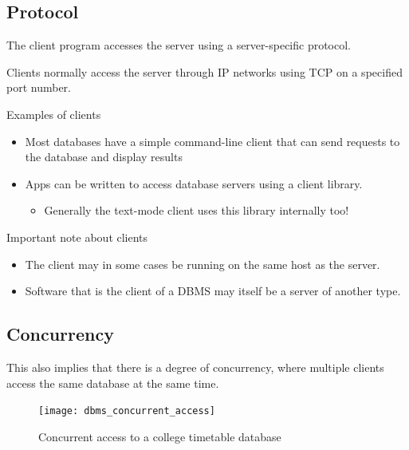 \documentclass[slides]{pgnotes}
\begin{document}
\subsection{Protocol}

The client program accesses the server using a server-specific protocol.

Clients normally access the server through IP networks using TCP on a specified port number.

\begin{greenbox}{Examples of clients}
\begin{itemize}
\item
  Most databases have a simple command-line client that can send
  requests to the database and display results
\item
  Apps can be written to access database servers using a client library.

  \begin{itemize}
  
  \item
    Generally the text-mode client uses this library internally too!
  \end{itemize}
\end{itemize}
\end{greenbox}

\begin{redbox}{Important note about clients}
\begin{itemize}
\item
  The client may in some cases be running on the same host as the
  server.
\item
  Software that is the client of a DBMS may itself be a server of another type.
\end{itemize}
\end{redbox}



\subsection{Concurrency}
\label{sec:concurrency}

This also implies that there is a degree of concurrency, where multiple
clients access the same database at the same time.

\begin{figure}[htbp]
  \centering
  \texttt{[image: dbms\_concurrent\_access]}
  \caption{Concurrent access to a college timetable database}
  \label{fig:concurrent-access}
\end{figure}
\end{document}

